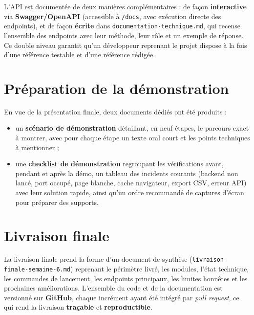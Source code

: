 L'API est documentée de deux manières complémentaires : de façon
\textbf{interactive} via \textbf{Swagger/OpenAPI} (accessible à \texttt{/docs},
avec exécution directe des endpoints), et de façon \textbf{écrite} dans
\texttt{documentation-technique.md}, qui recense l'ensemble des endpoints avec
leur méthode, leur rôle et un exemple de réponse. Ce double niveau garantit
qu'un développeur reprenant le projet dispose à la fois d'une référence testable
et d'une référence rédigée.

\section{Préparation de la démonstration}

En vue de la présentation finale, deux documents dédiés ont été produits :

\begin{itemize}
  \item un \textbf{scénario de démonstration} détaillant, en neuf étapes, le
        parcours exact à montrer, avec pour chaque étape un texte oral court et
        les points techniques à mentionner ;
  \item une \textbf{checklist de démonstration} regroupant les vérifications
        avant, pendant et après la démo, un tableau des incidents courants
        (backend non lancé, port occupé, page blanche, cache navigateur,
        export CSV, erreur API) avec leur solution rapide, ainsi qu'un ordre
        recommandé de captures d'écran pour préparer des supports.
\end{itemize}

\section{Livraison finale}

La livraison finale prend la forme d'un document de synthèse
(\texttt{livraison-finale-semaine-6.md}) reprenant le périmètre livré, les
modules, l'état technique, les commandes de lancement, les endpoints
principaux, les limites honnêtes et les prochaines améliorations. L'ensemble du
code et de la documentation est versionné sur \textbf{GitHub}, chaque incrément
ayant été intégré par \emph{pull request}, ce qui rend la livraison
\textbf{traçable} et \textbf{reproductible}.
